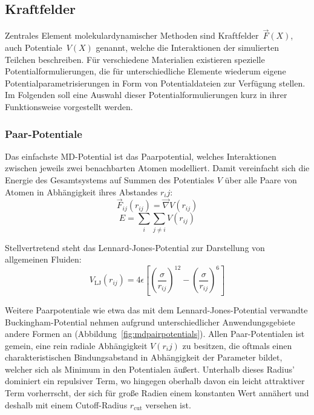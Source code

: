 \subsection{Kraftfelder}
\label{mdforcefields}

Zentrales Element molekulardynamischer Methoden sind Kraftfelder~$\vec F(X)$, auch Potentiale~$V(X)$ genannt, welche die Interaktionen der simulierten Teilchen beschreiben.
Für verschiedene Materialien existieren spezielle Potentialformulierungen, die für unterschiedliche Elemente wiederum eigene Potentialparametrisierungen in Form von Potentialdateien zur Verfügung stellen.
Im Folgenden soll eine Auswahl dieser Potentialformulierungen kurz in ihrer Funktionsweise vorgestellt werden.

\subsubsection{Paar-Potentiale}

Das einfachste MD-Potential ist das Paarpotential, welches Interaktionen zwischen jeweils zwei benachbarten Atomen modelliert.
Damit vereinfacht sich die Energie des Gesamtsystems auf Summen des Potentiales $V$ über alle Paare von Atomen in Abhängigkeit ihres Abstandes $r_ij$:
\begin{equation}
  \label{eq:pairforce}
  \vec F_{ij}(r_{ij}) = \vec\nabla V(r_{ij})
\end{equation}
\begin{equation}
  \label{eq:pairenergy}
  E = \sum_i\sum_{j \neq i}{V(r_{ij})}
\end{equation}

Stellvertretend steht das Lennard-Jones-Potential zur Darstellung von allgemeinen Fluiden:
\begin{equation}
  \label{eq:lennardjones}
  V_\text{LJ}(r_{ij}) = 4 \epsilon \left[\left(\frac{\sigma}{r_{ij}}\right)^{12} - \left(\frac{\sigma}{r_{ij}}\right)^{6}\right]
\end{equation}

Weitere Paarpotentiale wie etwa das mit dem Lennard-Jones-Potential verwandte Bucking\-ham-Potential nehmen aufgrund unterschiedlicher Anwendungsgebiete andere Formen an (Abbildung~\ref{fig:mdpairpotentials}).
Allen Paar-Potentialen ist gemein, eine rein radiale Abhängigkeit $V(r_ij)$ zu besitzen, die oftmals einen charakteristischen Bindungsabstand in Abhängigkeit der Parameter bildet, welcher sich als Minimum in den Potentialen äußert.
Unterhalb dieses Radius' dominiert ein repulsiver Term, wo hingegen oberhalb davon ein leicht attraktiver Term vorherrscht, der sich für große Radien einem konstanten Wert annähert und deshalb mit einem Cutoff-Radius $r_\text{cut}$ versehen ist.


